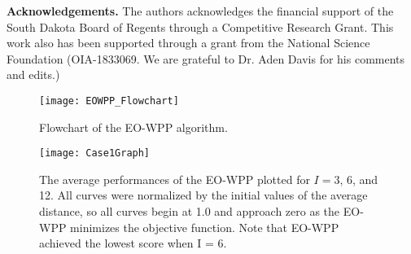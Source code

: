 \documentclass[authoryear]{elsarticle}
\begin{document}

\vspace{12pt}
\begin{flushleft}
{\bf Acknowledgements.} The authors acknowledges the financial support of the South Dakota Board of Regents through a Competitive Research Grant. This work also has been supported through a grant from the National Science Foundation (OIA-1833069. We are grateful to Dr. Aden Davis for his comments and edits.)
\end{flushleft}

\newpage






\begin{figure}
\centering
\texttt{[image: EOWPP\_Flowchart]}
\caption{Flowchart of the EO-WPP algorithm.}
\label{fig:EOWPP_Flowchart}
\end{figure}

\begin{figure}
\centering
\texttt{[image: Case1Graph]}
\caption{The average performances of the EO-WPP plotted for $I = 3$, 6, and 12. All curves were normalized by the initial values of the average distance, so all curves begin at 1.0 and approach zero as the EO-WPP minimizes the objective function. Note that EO-WPP achieved the lowest score when I = 6.}
\label{fig:Case1Graph}
\end{figure}
\end{document}
